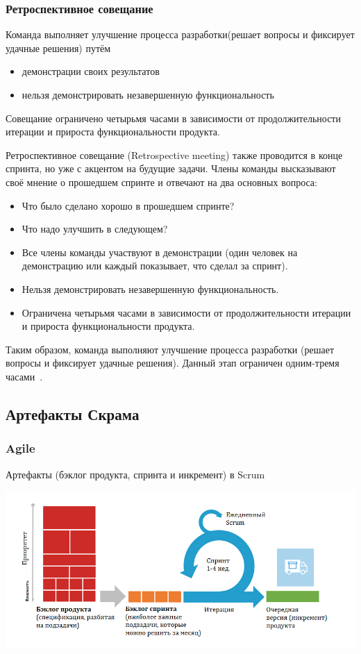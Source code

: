 \documentclass{../industrial-development}
\begin{document}
\begin{frame} \frametitle{Ретроспективное совещание}
Команда выполняет \alert{улучшение процесса разработки}(решает вопросы и фиксирует удачные решения) путём
\begin{itemize}
\item демонстрации своих результатов 
\item нельзя демонстрировать \alert{незавершенную функциональность}
\end{itemize}
Совещание ограничено \alert{четырьмя часами} в зависимости от продолжительности итерации и прироста функциональности продукта.
\end{frame}

\lecturenotes
Ретроспективное совещание (Retrospective meeting) также проводится в конце спринта, но уже с акцентом на будущие задачи. Члены команды высказывают своё мнение о прошедшем спринте и отвечают на два основных вопроса:
\begin{itemize}
\item Что было сделано хорошо в прошедшем спринте?
\item Что надо улучшить в следующем?
\item Все члены команды участвуют в демонстрации (один человек на демонстрацию или каждый показывает, что сделал за спринт).
\item Нельзя демонстрировать незавершенную функциональность.
\item Ограничена четырьмя часами в зависимости от продолжительности итерации и прироста функциональности продукта.
\end{itemize}
Таким образом, команда выполняют улучшение процесса разработки (решает вопросы и фиксирует удачные решения). Данный этап ограничен одним-тремя часами~\cite{Scrum}.


\subsection{Артефакты Скрама}

\begin{frame} \frametitle{Agile}
Артефакты (бэклог продукта, спринта и инкремент) в Scrum
\centerline{\includegraphics[height=0.6\textheight]{scrum.png}}
\end{frame}
\end{document}

